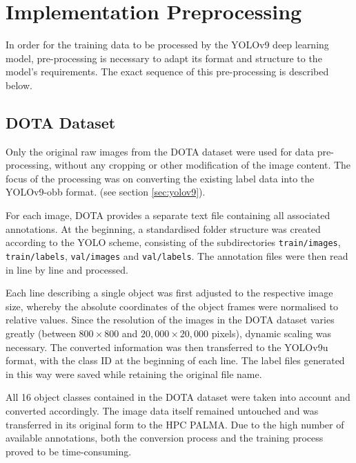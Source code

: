 

\section{Implementation Preprocessing}

In order for the training data to be processed by the YOLOv9 deep learning model, pre-processing is necessary to adapt its format and structure to the model's requirements. The exact sequence of this pre-processing is described below.
\subsection{DOTA Dataset}
Only the original raw images from the \acrshort{DOTA} dataset were used for data pre-processing, without any cropping or other modification of the image content. The focus of the processing was on converting the existing label data into the \acrshort{YOLO}v9-\acrshort{obb} format. (see section \ref{sec:yolov9}).

For each image, \acrshort{DOTA} provides a separate text file containing all associated annotations. At the beginning, a standardised folder structure was created according to the \acrshort{YOLO} scheme, consisting of the subdirectories \texttt{train/images}, \texttt{train/labels}, \texttt{val/images} and \texttt{val/labels}. The annotation files were then read in line by line and processed.

Each line describing a single object was first adjusted to the respective image size, whereby the absolute coordinates of the object frames were normalised to relative values. Since the resolution of the images in the \acrshort{DOTA} dataset varies greatly (between \(800 \times 800\) and \(20,000 \times 20,000\) pixels), dynamic scaling was necessary. The converted information was then transferred to the \acrshort{YOLO}v9u format, with the class ID at the beginning of each line. The label files generated in this way were saved while retaining the original file name.

All 16 object classes contained in the \acrshort{DOTA} dataset were taken into account and converted accordingly. The image data itself remained untouched and was transferred in its original form to the \acrshort{HPC} \acrshort{PALMA}. Due to the high number of available annotations, both the conversion process and the training process proved to be time-consuming.


